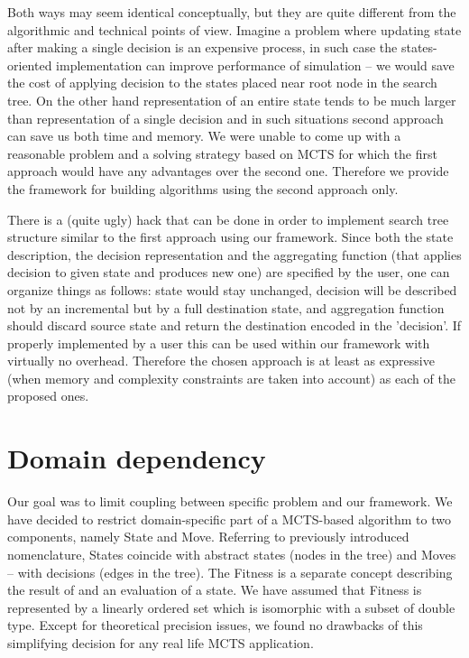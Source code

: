 Both ways may seem identical conceptually, but they are quite different from
the algorithmic and technical points of view.
Imagine a problem where updating state after making a single decision is an
expensive process, in such case the states-oriented implementation can improve
performance of simulation -- we would save the cost of applying decision to the
states placed near root node in the search tree.
On the other hand representation of an entire state tends to be much
larger than representation of a single decision and in such situations second
approach can save us both time and memory.
We were unable to come up with a reasonable problem and a solving strategy based on
MCTS for which the first approach would have any advantages over the second one.
Therefore we provide the framework for building algorithms using the second approach only.

There is a (quite ugly) hack that can be done in order to implement search
tree structure similar to the first approach using our framework. Since both the
state description, the decision representation and the aggregating function (that applies
decision to given state and produces new one) are specified by the user, one can
organize things as follows: state would stay unchanged, decision will be described not
by an incremental but by a full destination state, and aggregation function
should discard source state and return the destination encoded in the 'decision'.
If properly implemented by a user this can be used within our framework with
virtually no overhead. Therefore the chosen approach is at least as expressive
(when memory and complexity constraints are taken into account) as each of the
proposed ones.

\section{Domain dependency}
Our goal was to limit coupling between specific problem and our framework.
We have decided to restrict domain-specific part of a MCTS-based algorithm to two
components, namely State and Move. Referring to previously introduced
nomenclature, States coincide with abstract states (nodes in the tree) and
Moves -- with decisions (edges in the tree).
The Fitness is a separate concept describing the result of and an evaluation of a
state. We have assumed that Fitness is represented by a linearly ordered set
which is isomorphic with a subset of double type. Except for theoretical
precision issues, we found no drawbacks of this simplifying decision for any
real life MCTS application.

